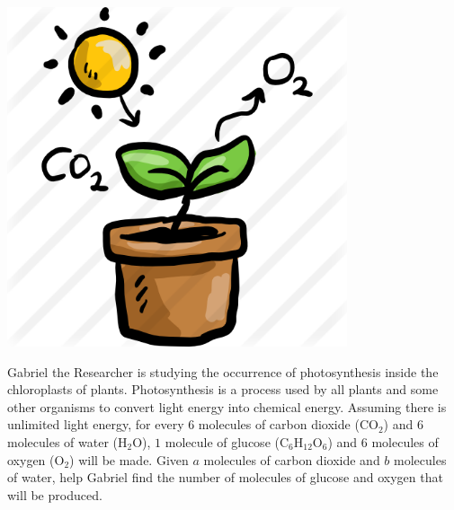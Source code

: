 \begin{center}
  \includegraphics[height=10cm]{photosynthesis-clipart-25.png} \\
\end{center}


Gabriel the Researcher is studying the occurrence of photosynthesis inside the chloroplasts of plants. Photosynthesis is a process used by all plants and some other organisms to convert light energy into chemical energy. Assuming there is unlimited light energy, for every $6$ molecules of carbon dioxide ($\text{CO}_2$) and $6$ molecules of water ($\text{H}_2\text{O}$), $1$ molecule of glucose ($\text{C}_6\text{H}_{12}\text{O}_6$) and $6$ molecules of oxygen ($\text{O}_2$) will be made. Given $a$ molecules of carbon dioxide and $b$ molecules of water, help Gabriel find the number of molecules of glucose and oxygen that will be produced.
